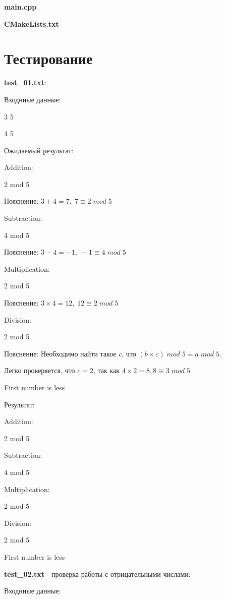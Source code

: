 \documentclass[a4paper, 12pt]{article}
\begin{document}
\vspace{3ex}
\textbf{\large{main.cpp}}


\vspace{3ex}
\textbf{\large{CMakeLists.txt}}

\newpage
\section{Тестирование}
\vspace{3ex}

\textbf{test\_01.txt}:

Входнные данные:

3 5

4 5

Ожидаемый результат:

Addition:

2 mod 5

Пояснение: $ 3 + 4 = 7,\; 7 \equiv 2\;mod\;5 $

Subtraction:

4 mod 5

Пояснение: $ 3 - 4 = -1,\; -1 \equiv 4\;mod\;5 $

Multiplication:

2 mod 5

Пояснение: $ 3 \times 4 = 12,\; 12 \equiv 2\;mod\;5 $

Division:

2 mod 5

Пояснение: Необходимо найти такое $ c $, что $ (b \times c)\;mod\;5 = a\;mod\;5 $.

Легко проверяется, что $ c = 2 $, так как $ 4 \times 2 = 8, 8 \equiv 3\;mod\;5 $

First number is less

Результат:

Addition:

2 mod 5

Subtraction:

4 mod 5

Multiplication:

2 mod 5

Division:

2 mod 5

First number is less


\vspace{3ex}

\textbf{test\_02.txt} - проверка работы с отрицательными числами:

Входнные данные:
\end{document}
